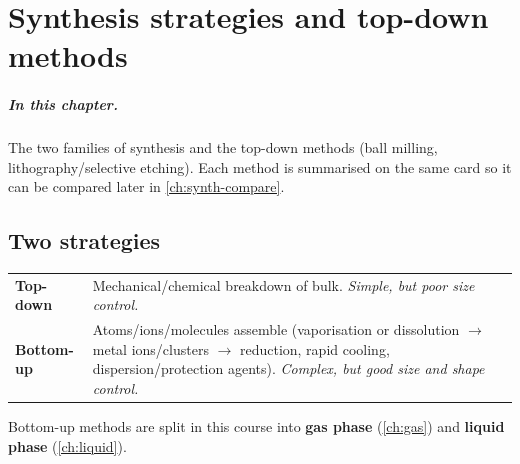 \chapter{Synthesis strategies and top-down methods}
\label{ch:topdown}

\paragraph{In this chapter.} The two families of synthesis and the top-down methods
(ball milling, lithography/selective etching). Each method is summarised on the same card so it can
be compared later in \cref{ch:synth-compare}.

\section{Two strategies}
\begin{center}
\end{center}

\begin{keybox}
\begin{tabularx}{\linewidth}{@{}lX@{}}
\textbf{Top-down} & Mechanical/chemical breakdown of bulk. \emph{Simple, but poor size control.} \\
\textbf{Bottom-up} & Atoms/ions/molecules assemble (vaporisation or dissolution $\to$ metal ions/clusters $\to$
reduction, rapid cooling, dispersion/protection agents). \emph{Complex, but good size and shape control.}
\end{tabularx}
\end{keybox}

Bottom-up methods are split in this course into \textbf{gas phase} (\cref{ch:gas}) and \textbf{liquid phase}
(\cref{ch:liquid}).

